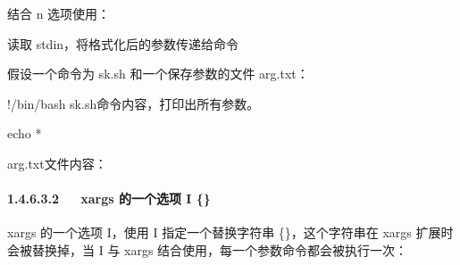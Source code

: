 \documentclass[letterpaper,12pt,english]{sphinxmanual}
\begin{document}
\begin{sphinxVerbatim}[commandchars=\\\{\}]

   
\end{sphinxVerbatim}

结合 \sphinxhyphen{}n 选项使用：

\begin{sphinxVerbatim}[commandchars=\\\{\}]

 
 
\end{sphinxVerbatim}

读取 stdin，将格式化后的参数传递给命令

假设一个命令为 sk.sh 和一个保存参数的文件 arg.txt：

\begin{sphinxVerbatim}[commandchars=\\\{\}]
\PYGZsh{}!/bin/bash
\PYGZsh{}sk.sh命令内容，打印出所有参数。

echo \PYGZdl{}*
\end{sphinxVerbatim}

arg.txt文件内容：

\begin{sphinxVerbatim}[commandchars=\\\{\}]

\end{sphinxVerbatim}


\paragraph{1.4.6.3.2   xargs 的一个选项 \sphinxhyphen{}I \{\}}
\label{\detokenize{001software/001install/linux:xargs-i}}
xargs 的一个选项 \sphinxhyphen{}I，使用 \sphinxhyphen{}I 指定一个替换字符串
\{\}，这个字符串在 xargs 扩展时会被替换掉，当 \sphinxhyphen{}I 与
xargs 结合使用，每一个参数命令都会被执行一次：

\begin{sphinxVerbatim}[commandchars=\\\{\}]

  
  
  
\end{sphinxVerbatim}
\end{document}
